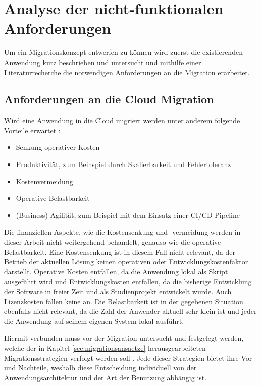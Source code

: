 \section{Analyse der nicht-funktionalen Anforderungen}
\label{sec:anforderungsanalyse}


Um ein Migrationskonzept entwerfen zu können wird zuerst die existierenden Anwendung kurz beschrieben und untersucht und mithilfe einer Literaturrecherche die notwendigen Anforderungen an die Migration erarbeitet.

\subsection{Anforderungen an die Cloud Migration}
Wird eine Anwendung in die Cloud migriert werden unter anderem folgende Vorteile erwartet \cite[Vgl. auch im Folgenden][03:23-05:36min]{AWS2019}:
\begin{itemize}
\item Senkung operativer Kosten
\item Produktivität, zum Beinspiel durch Skalierbarkeit und Fehlertoleranz
\item Kostenvermeidung
\item Operative Belastbarkeit
\item (Business) Agilität, zum Beispiel mit dem Einsatz einer CI/CD Pipeline
\end{itemize}

Die finanziellen Aspekte, wie die Kostensenkung und -vermeidung werden in dieser Arbeit nicht weitergehend behandelt, genauso wie die operative Belastbarkeit. Eine Kostensenkung ist in diesem Fall nicht relevant, da der Betrieb der aktuellen Lösung keinen operativen oder Entwicklungskostenfaktor darstellt. Operative Kosten entfallen, da die Anwendung lokal als Skript ausgeführt wird und Entwicklungskosten entfallen, da die bisherige Entwicklung der Software in freier Zeit und als Studienprojekt entwickelt wurde. Auch Lizenzkosten fallen keine an. Die Belastbarkeit ist in der gegebenen Situation ebenfalls nicht relevant, da die Zahl der Anwender aktuell sehr klein ist und jeder die Anwendung auf seinem eigenen System lokal ausführt. \pagebreak

Hiermit verbunden muss vor der Migration untersucht und festgelegt werden, welche der in Kapitel \ref{sec:migrationsansaetze} herausgearbeiteten Migrationsstrategien verfolgt werden soll \cite[Vgl.][10:38-13:23min]{AWS2019}. Jede dieser Strategien bietet ihre Vor- und Nachteile, weshalb diese Entscheidung individuell von der Anwendungsarchitektur und der Art der Benutzung abhängig ist.

